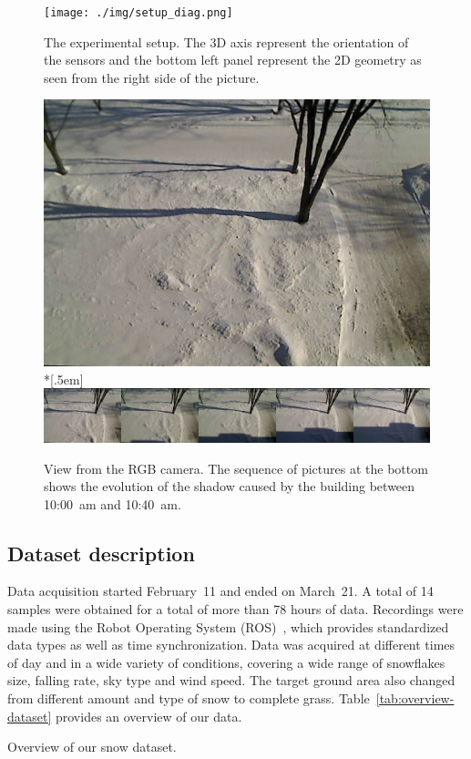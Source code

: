 \begin{figure}[th]
    \centering
    \texttt{[image: ./img/setup\_diag.png]}
    \caption{The experimental setup. The 3D axis represent the orientation of the sensors and the bottom left panel represent the 2D geometry as seen from the right side of the picture. }
    \label{fig:setup}
\end{figure}

\begin{figure}[th]
    \centering
    \includegraphics[width=0.90\linewidth]{./img/camera_view.jpg}\\*[.5em]
    \includegraphics[width=0.90\linewidth]{./img/shadow2.png}
    \caption{View from the RGB camera. The sequence of pictures at the bottom shows the evolution of the shadow caused by the building between 10:00~am and 10:40~am.}
    \label{fig:view}
\end{figure}

\subsection{Dataset description} %
Data acquisition started February~11 and ended on March~21. A total of 14 samples were obtained for a total of more than 78 hours of data. Recordings were made using the Robot Operating System (ROS)~\cite{ROSWeb}, which provides standardized data types as well as time synchronization. Data was acquired at different times of day and in a wide variety of conditions, covering a wide range of snowflakes size, falling rate, sky type and wind speed. The target ground area also changed from different amount and type of snow to complete grass. Table~\ref{tab:overview-dataset} provides an overview of our data. 

\begin{table}
\caption{Overview of our snow dataset. }
\label{tab:overview-dataset}
\end{table}




